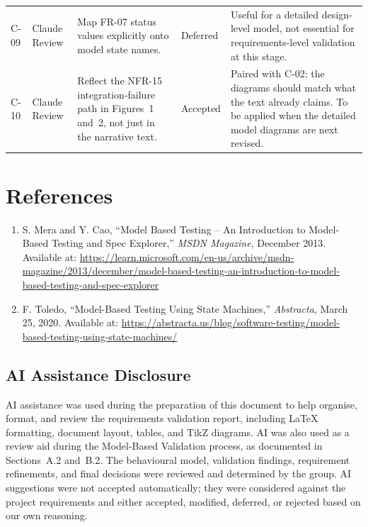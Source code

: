 \documentclass[11pt,a4paper]{article}
\begin{document}
\begin{center}
\begin{tabularx}{\textwidth}{@{} l l X >{\centering\arraybackslash}p{1.9cm} X @{}}
C-09 & Claude Review & Map FR-07 status values explicitly onto model state names. & Deferred & Useful for a detailed design-level model, not essential for requirements-level validation at this stage. \\
C-10 & Claude Review & Reflect the NFR-15 integration-failure path in Figures~1 and~2, not just in the narrative text. & Accepted & Paired with C-02; the diagrams should match what the text already claims. To be applied when the detailed model diagrams are next revised. \\
\bottomrule
\end{tabularx}
\end{center}


\section*{References}

\begin{enumerate}[leftmargin=1.5em]

    \item S. Mera and Y. Cao,
    ``Model Based Testing -- An Introduction to Model-Based Testing
    and Spec Explorer,''
    \textit{MSDN Magazine}, December 2013.
    Available at:
    \url{https://learn.microsoft.com/en-us/archive/msdn-magazine/2013/december/model-based-testing-an-introduction-to-model-based-testing-and-spec-explorer}

    \item F. Toledo,
    ``Model-Based Testing Using State Machines,''
    \textit{Abstracta}, March 25, 2020.
    Available at:
    \url{https://abstracta.us/blog/software-testing/model-based-testing-using-state-machines/}

\end{enumerate}

\subsection*{AI Assistance Disclosure}

AI assistance was used during the preparation of this document to help
organise, format, and review the requirements validation report,
including LaTeX formatting, document layout, tables, and TikZ diagrams.
AI was also used as a review aid during the Model-Based Validation
process, as documented in Sections~A.2 and~B.2. The behavioural model,
validation findings, requirement refinements, and final decisions were
reviewed and determined by the group. AI suggestions were not accepted
automatically; they were considered against the project requirements
and either accepted, modified, deferred, or rejected based on our own
reasoning.


\label{LastPage}
\end{document}
